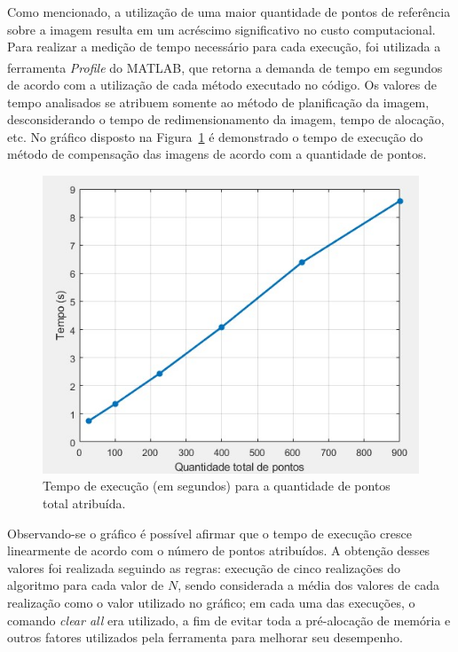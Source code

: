 Como mencionado, a utilização de uma maior quantidade de pontos de referência sobre a imagem resulta em um acréscimo significativo no custo computacional. 
Para realizar a medição de tempo necessário para cada execução, foi utilizada a ferramenta \textit{Profile} do MATLAB\textsuperscript{\tiny\textregistered}, que retorna a demanda de tempo em segundos de acordo com a utilização de cada método executado no código. Os valores de tempo analisados se atribuem somente ao método de planificação da imagem, desconsiderando o tempo de redimensionamento da imagem, tempo de alocação, etc. No gráfico disposto na Figura~\ref{fig:grafico_time} é demonstrado o tempo de execução do método de compensação das imagens de acordo com a quantidade de pontos.

\begin{figure}[ht]
    \caption{Tempo de execução (em segundos) para a quantidade de pontos total atribuída.}
    \centering
    \vspace{.3cm}
    \begin{minipage}{.7\textwidth}
        \hspace{.3cm}
        \includegraphics[width=\textwidth]{TCC/Imagens/ensaios/grafico.jpg}
	\end{minipage}
    \label{fig:grafico_time}
\end{figure}

Observando-se o gráfico é possível afirmar que o tempo de execução cresce linearmente de acordo com o número de pontos atribuídos. A obtenção desses valores foi realizada seguindo as regras: execução de cinco realizações do algoritmo para cada valor de $N$, sendo considerada a média  dos valores de cada realização como o valor utilizado no gráfico; em cada uma das execuções, o comando \textit{clear all} era utilizado, a fim de evitar toda a pré-alocação de memória e outros fatores utilizados pela ferramenta para melhorar seu desempenho.

